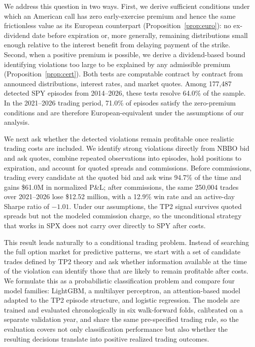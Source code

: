 \documentclass[sigconf,review]{acmart}
\begin{document}
We address this question in two ways. First, we derive sufficient conditions under which an American call has zero early-exercise premium and hence the same frictionless value as its European counterpart (Proposition~\ref{prop:euro}): no ex-dividend date before expiration or, more generally, remaining distributions small enough relative to the interest benefit from delaying payment of the strike. Second, when a positive premium is possible, we derive a dividend-based bound identifying violations too large to be explained by any admissible premium (Proposition~\ref{prop:cert}). Both tests are computable contract by contract from announced distributions, interest rates, and market quotes. Among 177{,}487 detected SPY episodes from 2014--2026, these tests resolve 64.0\% of the sample. In the 2021--2026 trading period, 71.0\% of episodes satisfy the zero-premium conditions and are therefore European-equivalent under the assumptions of our analysis.

We next ask whether the detected violations remain profitable once realistic trading costs are included. We identify strong violations directly from NBBO bid and ask quotes, combine repeated observations into episodes, hold positions to expiration, and account for quoted spreads and commissions. Before commissions, trading every candidate at the quoted bid and ask wins 94.7\% of the time and gains \$61.0M in normalized P\&L; after commissions, the same 250{,}004 trades over 2021--2026 lose \$12.52 million, with a 12.9\% win rate and an active-day Sharpe ratio of $-1.01$. Under our assumptions, the TP2 signal survives quoted spreads but not the modeled commission charge, so the unconditional strategy that works in SPX does not carry over directly to SPY after costs.

This result leads naturally to a conditional trading problem. Instead of searching the full option market for predictive patterns, we start with a set of candidate trades defined by TP2 theory and ask whether information available at the time of the violation can identify those that are likely to remain profitable after costs. We formulate this as a probabilistic classification problem and compare four model families: LightGBM, a multilayer perceptron, an attention-based model adapted to the TP2 episode structure, and logistic regression. The models are trained and evaluated chronologically in six walk-forward folds, calibrated on a separate validation year, and share the same pre-specified trading rule, so the evaluation covers not only classification performance but also whether the resulting decisions translate into positive realized trading outcomes.
\end{document}
